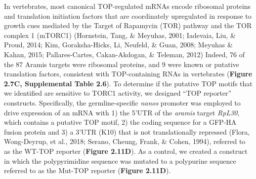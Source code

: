 \documentclass[12pt,oneside]{reedthesis}
\begin{document}
In vertebrates, most canonical TOP-regulated mRNAs encode ribosomal proteins and translation initiation factors that are coordinately upregulated in response to growth cues mediated by the Target of Rapamycin (TOR) pathway and the TOR complex 1 (mTORC1) (Hornstein, Tang, \& Meyuhas, 2001; Iadevaia, Liu, \& Proud, 2014; Kim, Goraksha-Hicks, Li, Neufeld, \& Guan, 2008; Meyuhas \& Kahan, 2015; Pallares-Cartes, Cakan-Akdogan, \& Teleman, 2012) Indeed, 76 of the 87 Aramis targets were ribosomal proteins, and 9 were known or putative translation factors, consistent with TOP-containing RNAs in vertebrates (\textbf{Figure 2.7C, Supplemental Table 2.6}). To determine if the putative TOP motifs that we identified are sensitive to TORC1 activity, we designed ``TOP reporter'' constructs. Specifically, the germline-specific \emph{nanos} promoter was employed to drive expression of an mRNA with 1) the 5'UTR of the \emph{aramis} target \emph{RpL30}, which contains a putative TOP motif, 2) the coding sequence for a GFP-HA fusion protein and 3) a 3'UTR (K10) that is not translationally repressed (Flora, Wong-Deyrup, et al., 2018; Serano, Cheung, Frank, \& Cohen, 1994), referred to as the WT-TOP reporter (\textbf{Figure 2.11D}). As a control, we created a construct in which the polypyrimidine sequence was mutated to a polypurine sequence referred to as the Mut-TOP reporter (\textbf{Figure 2.11D}).
\end{document}
